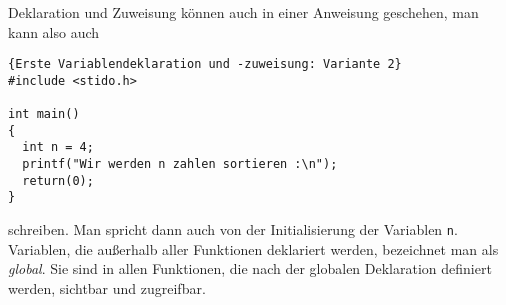 Deklaration und Zuweisung können auch in einer Anweisung geschehen, man kann also auch
\begin{lstlisting}{Erste Variablendeklaration und -zuweisung: Variante 2}
#include <stido.h>

int main()
{
  int n = 4;
  printf("Wir werden n zahlen sortieren :\n");
  return(0);
}
\end{lstlisting}
schreiben. 
Man spricht dann auch von der Initialisierung der Variablen \texttt{n}.
Variablen, die außerhalb aller Funktionen deklariert werden, bezeichnet man als \emph{global}.
Sie sind in allen Funktionen, die nach der globalen Deklaration definiert werden, sichtbar und zugreifbar.

%
